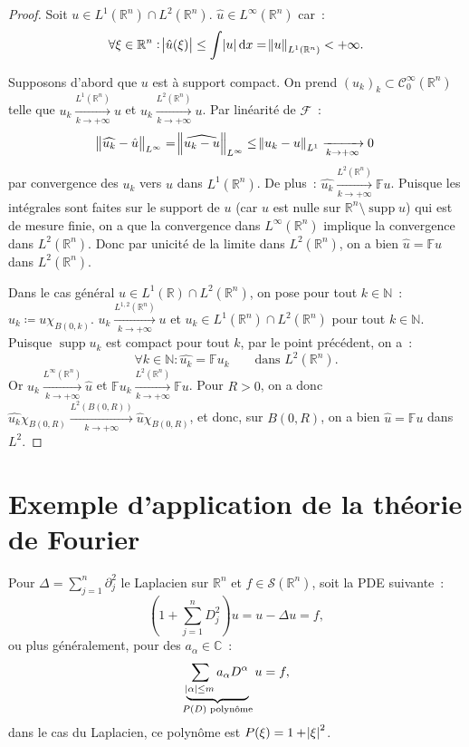 \documentclass{report}
\DeclareMathOperator{\supp}{supp}
\newcommand{\C}{{\mathbb C}}
\newcommand{\R}{{\mathbb R}}
\newcommand{\N}{{\mathbb N}}
\newcommand{\pinfty}{{+\infty}}
\theoremstyle{definition}
\theoremstyle{remark}
\begin{document}
\begin{proof} Soit $u \in L^1(\R^n) \cap L^2(\R^n)$. $\hat u \in L^\infty(\R^n)$ car~:
\[\forall \xi \in \R^n : \abs {\hat u(\xi)} \leq \int\abs u\dif x = \norm u_{L^1(\R^n)} < \pinfty.\]

Supposons d'abord que $u$ est à support compact. On prend $(u_k)_k \subset \mathcal C^\infty_0(\R^n)$ telle que $u_k \xrightarrow[k \to \pinfty]{L^1(\R^n)} u$ et
$u_k \xrightarrow[k \to \pinfty]{L^2(\R^n)} u$. Par linéarité de $\mathcal F$~:
\[\norm {\widehat {u_k} - \hat u}_{L^\infty} = \norm {\widehat {u_k - u}}_{L^\infty} \leq \norm {u_k-u}_{L^1} \xrightarrow[k \to \pinfty]{} 0\]
par convergence des $u_k$ vers $u$ dans $L^1(\R^n)$. De plus~: $\widehat {u_k} \xrightarrow[k \to \pinfty]{L^2(\R^n)} \mathbb Fu$. Puisque les intégrales sont faites
sur le support de $u$ (car $u$ est nulle sur $\R^n \setminus \supp u$) qui est de mesure finie, on a que la convergence dans $L^\infty(\R^n)$ implique la convergence dans $L^2(\R^n)$.
Donc par unicité de la limite dans $L^2(\R^n)$, on a bien $\hat u = \mathbb Fu$ dans $L^2(\R^n)$.

Dans le cas général $u \in L^1(\R) \cap L^2(\R^n)$, on pose pour tout $k \in \N$~: $u_k \coloneqq u\chi_{B(0, k)}$. $u_k \xrightarrow[k \to \pinfty]{L^{1,2}(\R^n)} u$
et $u_k \in L^1(\R^n) \cap L^2(\R^n)$ pour tout $k \in \N$. Puisque $\supp u_k$ est compact pour tout $k$, par le point précédent, on a~:
\[\forall k \in \N : \widehat {u_k} = \mathbb Fu_k \qquad \text{dans } L^2(\R^n).\]
Or $\widehat {u_k} \xrightarrow[k \to \pinfty]{L^\infty(\R^n)} \hat u$ et $\mathbb Fu_k \xrightarrow[k \to \pinfty]{L^2(\R^n)} \mathbb Fu$. Pour $R > 0$,
on a donc $\widehat {u_k}\chi_{B(0, R)} \xrightarrow[k \to \pinfty]{L^2(B(0, R))} \hat u\chi_{B(0, R)}$, et donc, sur $B(0, R)$, on a bien $\hat u = \mathbb Fu$ dans $L^2$.
\end{proof}

\section{Exemple d'application de la théorie de Fourier}

Pour $\Delta = \sum_{j=1}^n\partial_j^2$ le Laplacien sur $\R^n$ et $f \in \mathcal S(\R^n)$, soit la PDE suivante~:
\begin{equation}
	(1+\sum_{j=1}^nD_j^2)u = u-\Delta u = f,
\end{equation}
ou plus généralement, pour des $a_\alpha \in \C$~:
\begin{equation}\label{eq:PDE générale Fourier}
	\underbrace {\sum_{\abs \alpha \leq m}a_\alpha D^\alpha}_{P(D) \text{ polynôme}} u = f,
\end{equation}
dans le cas du Laplacien, ce polynôme est $P(\xi) = 1+\abs \xi^2$.
\end{document}
